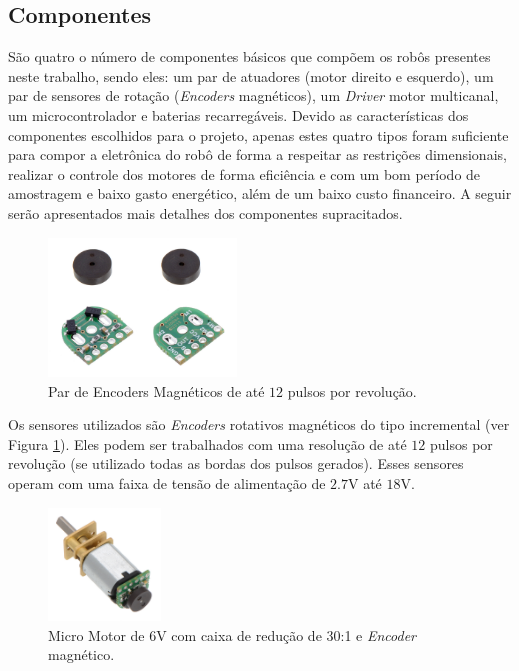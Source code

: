 \subsection{Componentes}
\label{subsec:componentes}

São quatro o número de componentes básicos que compõem os robôs presentes neste trabalho, sendo eles: um par de atuadores (motor direito e esquerdo), um par de sensores de rotação (\textit{Encoders} magnéticos), um \emph{Driver} motor multicanal, um microcontrolador e baterias recarregáveis. Devido as características dos componentes escolhidos para o projeto, apenas estes quatro tipos foram suficiente para compor a eletrônica do robô de forma a respeitar as restrições dimensionais, realizar o controle dos motores de forma eficiência e com um bom período de amostragem e baixo gasto energético, além de um baixo custo financeiro. A seguir serão apresentados mais detalhes dos componentes supracitados.\\

\begin{figure}[H]
    \centering
    \includegraphics[width=5cm]{figuras/eletronica/encoder_frente_verso.jpg}
    \caption{Par de Encoders Magnéticos de até $12$ pulsos por revolução.}
    \label{fig:encoder}
\end{figure}

Os sensores utilizados são \emph{Encoders} rotativos magnéticos do tipo incremental (ver Figura \ref{fig:encoder}). Eles podem ser trabalhados com uma resolução de até $12$ pulsos por revolução (se utilizado todas as bordas dos pulsos gerados). Esses sensores operam com uma faixa de tensão de alimentação de $2.7$V até $18$V.\\

\begin{figure}[H]
    \centering
    \includegraphics[width=3cm]{figuras/eletronica/motor_com_encoder.jpg}
    \caption{Micro Motor de 6V com caixa de redução de 30:1 e \textit{Encoder} magnético.}
    \label{fig:motor_com_encoder}
\end{figure}


